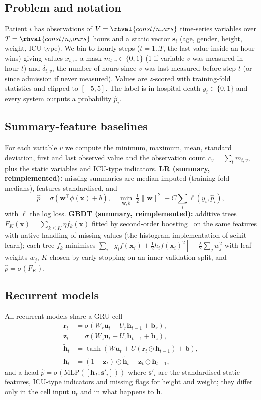 \subsection{Problem and notation}
Patient $i$ has observations of $V=\rhval{const/n_vars}$ time-series variables over $T=\rhval{const/n_hours}$ hours and a static vector $\mathbf{s}_i$ (age, gender, height, weight, ICU type). We bin to hourly steps ($t=1..T$, the last value inside an hour wins) giving values $x_{t,v}$, a mask $m_{t,v}\in\{0,1\}$ (1 if variable $v$ was measured in hour $t$) and $\delta_{t,v}$, the number of hours since $v$ was last measured before step $t$ (or since admission if never measured). Values are $z$-scored with training-fold statistics and clipped to $[-5,5]$. The label is in-hospital death $y_i\in\{0,1\}$ and every system outputs a probability $\hat p_i$.

\subsection{Summary-feature baselines}
For each variable $v$ we compute the minimum, maximum, mean, standard deviation, first and last observed value and the observation count $c_v=\sum_t m_{t,v}$, plus the static variables and ICU-type indicators. \textbf{LR (summary, reimplemented):} missing summaries are median-imputed (training-fold medians), features standardised, and
\begin{equation}
\hat p = \sigma(\mathbf{w}^\top \phi(\mathbf{x}) + b),\quad \min_{\mathbf{w},b}\ \tfrac{1}{2}\|\mathbf{w}\|^2 + C\sum_i \ell(y_i,\hat p_i),
\end{equation}
with $\ell$ the log loss. \textbf{GBDT (summary, reimplemented):} additive trees $F_K(\mathbf{x})=\sum_{k\le K}\eta f_k(\mathbf{x})$ fitted by second-order boosting~\cite{chen2016xgboost} on the same features with native handling of missing values (the histogram implementation of scikit-learn); each tree $f_k$ minimises $\sum_i [g_i f(\mathbf{x}_i)+\tfrac12 h_i f(\mathbf{x}_i)^2]+\tfrac{\lambda}{2}\sum_j w_j^2$ with leaf weights $w_j$, $K$ chosen by early stopping on an inner validation split, and $\hat p=\sigma(F_K)$.

\subsection{Recurrent models}
All recurrent models share a GRU cell~\cite{cho2014learning}
\begin{align}
\mathbf{r}_t&=\sigma(W_r\mathbf{u}_t+U_r\mathbf{h}_{t-1}+\mathbf{b}_r),\\
\mathbf{z}_t&=\sigma(W_z\mathbf{u}_t+U_z\mathbf{h}_{t-1}+\mathbf{b}_z),\\
\tilde{\mathbf{h}}_t&=\tanh(W\mathbf{u}_t+U(\mathbf{r}_t\odot\mathbf{h}_{t-1})+\mathbf{b}),\\
\mathbf{h}_t&=(1-\mathbf{z}_t)\odot\tilde{\mathbf{h}}_t+\mathbf{z}_t\odot\mathbf{h}_{t-1},
\end{align}
and a head $\hat p=\sigma(\mathrm{MLP}([\mathbf{h}_T;\mathbf{s}'_i]))$ where $\mathbf{s}'_i$ are the standardised static features, ICU-type indicators and missing flags for height and weight; they differ only in the cell input $\mathbf{u}_t$ and in what happens to $\mathbf{h}$.

